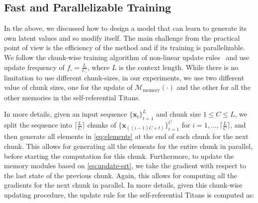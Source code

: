 \documentclass{article}
\newcommand{\citep}{\parencite}
\newcommand{\M}[0]{\mathcal{M}}
\begin{document}
{\subsection{Fast and Parallelizable Training}\label{sec:Parallel-srt}
In the above, we discussed how to design a model that can learn to generate its own latent values and so modify itself. The main challenge from the practical point of view is the efficiency of the method and if its training is parallelizable. We follow the chunk-wise training algorithm of non-linear update rules~\citep{sun2024learning, behrouz2024titans} and use update frequency of $f_{\square} = \frac{L}{C_{\square}}$, where $L$ is the context length. While there is no limitation to use different chunk-sizes, in our experiments, we use two different value of chunk sizes, one for the update of $\M_{\text{memory}}(\cdot)$ and the other for all the other memories in the self-referential Titans. 

In more details, given an input sequence $\{\boldsymbol{x}_t\}_{t=1}^{L}$ and chunk size $1 \leq C \leq L$, we split the sequence into $\lceil \frac{L}{C} \rceil$ chunks of $\{\boldsymbol{x}_{((i-1)C + t)} \}_{t = 1}^{C}$ for $i = 1, \dots , \lceil \frac{L}{C} \rceil$, and then generate all elements in \autoref{eq:elements} at the end of each chunk for the next chunk. This allows for generating all the elements for the entire chunk in parallel, before starting the computation for this chunk. Furthermore, to update the memory modules based on \autoref{eq:update-srt}, we take the gradient with respect to the last state of the previous chunk. Again, this allows for computing all the gradients for the next chunk in parallel. In more details, given this chunk-wise updating procedure, the update rule for the self-referential Titans is computed as:

}
\end{document}
